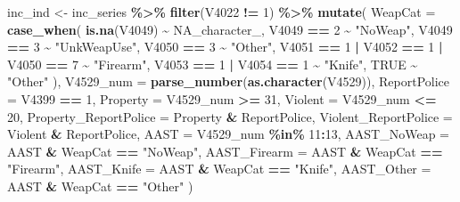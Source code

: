 \documentclass[
]{krantz}
\makeatletter
\newenvironment{Shaded}{\begin{snugshade}}{\end{snugshade}}
\newcommand{\AttributeTok}[1]{\textcolor[rgb]{0.27,0.27,0.27}{#1}}
\newcommand{\ConstantTok}[1]{\textcolor[rgb]{0.37,0.37,0.37}{#1}}
\newcommand{\DecValTok}[1]{\textcolor[rgb]{0.06,0.06,0.06}{#1}}
\newcommand{\FunctionTok}[1]{\textcolor[rgb]{0.27,0.27,0.27}{\textbf{#1}}}
\newcommand{\NormalTok}[1]{#1}
\newcommand{\OtherTok}[1]{\textcolor[rgb]{0.37,0.37,0.37}{#1}}
\newcommand{\SpecialCharTok}[1]{\textcolor[rgb]{0.43,0.43,0.43}{\textbf{#1}}}
\newcommand{\StringTok}[1]{\textcolor[rgb]{0.5,0.5,0.5}{#1}}
\newenvironment{kframe}{%
\medskip{}
\setlength{\fboxsep}{.8em}
 \def\at@end@of@kframe{}%
 \ifinner\ifhmode%
  \def\at@end@of@kframe{\end{minipage}}%
  \begin{minipage}{\columnwidth}%
 \fi\fi%
 \def\FrameCommand##1{\hskip\@totalleftmargin \hskip-\fboxsep
 \colorbox{shadecolor}{##1}\hskip-\fboxsep
     \hskip-\linewidth \hskip-\@totalleftmargin \hskip\columnwidth}%
 \MakeFramed {\advance\hsize-\width
   \@totalleftmargin\z@ \linewidth\hsize
   \@setminipage}}%
 {\par\unskip\endMakeFramed%
 \at@end@of@kframe}
\renewenvironment{Shaded}{\begin{kframe}}{\end{kframe}}
\makeatother
\begin{document}
\begin{Shaded}
\begin{Highlighting}[]
\NormalTok{inc\_ind }\OtherTok{\textless{}{-}}\NormalTok{ inc\_series }\SpecialCharTok{\%\textgreater{}\%}
  \FunctionTok{filter}\NormalTok{(V4022 }\SpecialCharTok{!=} \DecValTok{1}\NormalTok{) }\SpecialCharTok{\%\textgreater{}\%}
  \FunctionTok{mutate}\NormalTok{(}
    \AttributeTok{WeapCat =} \FunctionTok{case\_when}\NormalTok{(}
      \FunctionTok{is.na}\NormalTok{(V4049) }\SpecialCharTok{\textasciitilde{}} \ConstantTok{NA\_character\_}\NormalTok{,}
\NormalTok{      V4049 }\SpecialCharTok{==} \DecValTok{2} \SpecialCharTok{\textasciitilde{}} \StringTok{"NoWeap"}\NormalTok{,}
\NormalTok{      V4049 }\SpecialCharTok{==} \DecValTok{3} \SpecialCharTok{\textasciitilde{}} \StringTok{"UnkWeapUse"}\NormalTok{,}
\NormalTok{      V4050 }\SpecialCharTok{==} \DecValTok{3} \SpecialCharTok{\textasciitilde{}} \StringTok{"Other"}\NormalTok{,}
\NormalTok{      V4051 }\SpecialCharTok{==} \DecValTok{1} \SpecialCharTok{|}\NormalTok{ V4052 }\SpecialCharTok{==} \DecValTok{1} \SpecialCharTok{|}\NormalTok{ V4050 }\SpecialCharTok{==} \DecValTok{7} \SpecialCharTok{\textasciitilde{}} \StringTok{"Firearm"}\NormalTok{,}
\NormalTok{      V4053 }\SpecialCharTok{==} \DecValTok{1} \SpecialCharTok{|}\NormalTok{ V4054 }\SpecialCharTok{==} \DecValTok{1} \SpecialCharTok{\textasciitilde{}} \StringTok{"Knife"}\NormalTok{,}
      \ConstantTok{TRUE} \SpecialCharTok{\textasciitilde{}} \StringTok{"Other"}
\NormalTok{    ),}
    \AttributeTok{V4529\_num =} \FunctionTok{parse\_number}\NormalTok{(}\FunctionTok{as.character}\NormalTok{(V4529)),}
    \AttributeTok{ReportPolice =}\NormalTok{ V4399 }\SpecialCharTok{==} \DecValTok{1}\NormalTok{,}
    \AttributeTok{Property =}\NormalTok{ V4529\_num }\SpecialCharTok{\textgreater{}=} \DecValTok{31}\NormalTok{,}
    \AttributeTok{Violent =}\NormalTok{ V4529\_num }\SpecialCharTok{\textless{}=} \DecValTok{20}\NormalTok{,}
    \AttributeTok{Property\_ReportPolice =}\NormalTok{ Property }\SpecialCharTok{\&}\NormalTok{ ReportPolice,}
    \AttributeTok{Violent\_ReportPolice =}\NormalTok{ Violent }\SpecialCharTok{\&}\NormalTok{ ReportPolice,}
    \AttributeTok{AAST =}\NormalTok{ V4529\_num }\SpecialCharTok{\%in\%} \DecValTok{11}\SpecialCharTok{:}\DecValTok{13}\NormalTok{,}
    \AttributeTok{AAST\_NoWeap =}\NormalTok{ AAST }\SpecialCharTok{\&}\NormalTok{ WeapCat }\SpecialCharTok{==} \StringTok{"NoWeap"}\NormalTok{,}
    \AttributeTok{AAST\_Firearm =}\NormalTok{ AAST }\SpecialCharTok{\&}\NormalTok{ WeapCat }\SpecialCharTok{==} \StringTok{"Firearm"}\NormalTok{,}
    \AttributeTok{AAST\_Knife =}\NormalTok{ AAST }\SpecialCharTok{\&}\NormalTok{ WeapCat }\SpecialCharTok{==} \StringTok{"Knife"}\NormalTok{,}
    \AttributeTok{AAST\_Other =}\NormalTok{ AAST }\SpecialCharTok{\&}\NormalTok{ WeapCat }\SpecialCharTok{==} \StringTok{"Other"}
\NormalTok{  )}
\end{Highlighting}
\end{Shaded}
\end{document}
